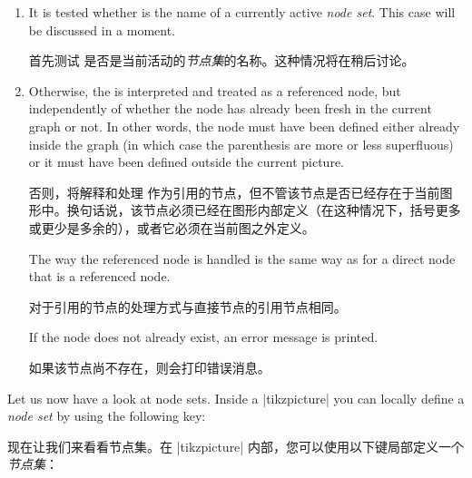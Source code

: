 \begin{enumerate}
    \item It is tested whether  is the name of a currently active
        \emph{node set}. This case will be discussed in a moment.

        首先测试  是否是当前活动的\emph{节点集}的名称。这种情况将在稍后讨论。
    \item Otherwise, the  is interpreted and treated as a referenced
        node, but independently of whether the node has already been fresh in
        the current graph or not. In other words, the node must have been
        defined either already inside the graph (in which case the parenthesis
        are more or less superfluous) or it must have been defined outside the
        current picture.

        否则，将解释和处理  作为引用的节点，但不管该节点是否已经存在于当前图形中。换句话说，该节点必须已经在图形内部定义（在这种情况下，括号更多或更少是多余的），或者它必须在当前图之外定义。

        The way the referenced node is handled is the same way as for a direct
        node that is a referenced node.

        对于引用的节点的处理方式与直接节点的引用节点相同。

        If the node does not already exist, an error message is printed.

        如果该节点尚不存在，则会打印错误消息。
\end{enumerate}

Let us now have a look at node sets. Inside a |{tikzpicture}| you can locally
define a \emph{node set} by using the following key:

现在让我们来看看节点集。在 |{tikzpicture}| 内部，您可以使用以下键局部定义一个\emph{节点集}：

